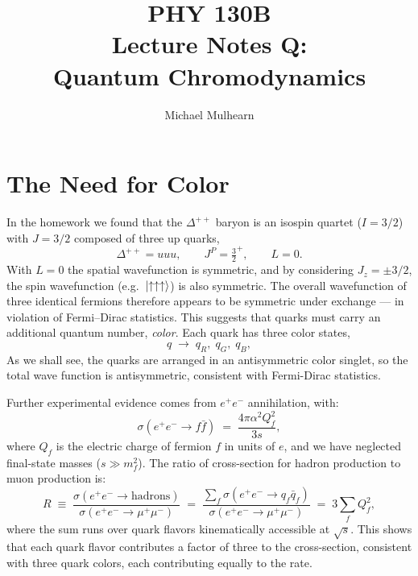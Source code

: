 \documentclass[12pt]{article}
\begin{document}
\title{PHY 130B \\ Lecture Notes Q: \\
Quantum Chromodynamics\\}
\author{Michael Mulhearn}

\maketitle

\setcounter{exercise}{0}

\newcommand{\exercise}{
\stepcounter{exercise}
\noindent
{\bf Exercise E.\theexercise:}
}

\section{The Need for Color}

In the homework we found that the $\Delta^{++}$ baryon is an
isospin quartet ($I=3/2$) with $J=3/2$ composed of three up quarks,
\begin{equation*}
    \Delta^{++} = uuu, \qquad J^P = \tfrac{3}{2}^{+}, \qquad L = 0.
\end{equation*}
With $L=0$ the spatial wavefunction is symmetric, and by considering
$J_z=\pm 3/2$, the spin wavefunction
(e.g.\ $\ket{\uparrow\uparrow\uparrow}$) is also symmetric. The
overall wavefunction of three identical fermions therefore
appears to be symmetric under exchange --- in violation of
Fermi--Dirac statistics.  This suggests that quarks must carry an
additional quantum number, \emph{color}.  Each quark has three color
states,
\begin{equation*}
    q \;\longrightarrow\; q_R,\; q_G,\; q_B,
\end{equation*}
As we shall see, the quarks are arranged in an antisymmetric color
singlet, so the total wave function is antisymmetric, consistent with
Fermi-Dirac statistics.

Further experimental evidence comes from $e^+e^-$ annihilation, with:
\begin{equation*}
    \sigma(e^+e^- \to f\bar f) \;=\; \frac{4\pi\alpha^2 Q_f^2}{3s},
\end{equation*}
where $Q_f$ is the electric charge of fermion $f$ in units of $e$, and
we have neglected final-state masses ($s \gg m_f^2$). The ratio of
cross-section for hadron production to muon production is:
\begin{equation*}
    R \;\equiv\; \frac{\sigma(e^+e^- \to \text{hadrons})}{\sigma(e^+e^- \to \mu^+\mu^-)}
       \;=\; \frac{\sum_f \sigma(e^+e^- \to q_f \bar q_f)}{\sigma(e^+e^- \to \mu^+\mu^-)}
       \;=\; 3 \sum_f Q_f^2,
\end{equation*}
where the sum runs over quark flavors kinematically accessible at
$\sqrt{s}$.  This shows that each quark flavor contributes a factor of
three to the cross-section, consistent with three quark colors, each
contributing equally to the rate.
\end{document}

